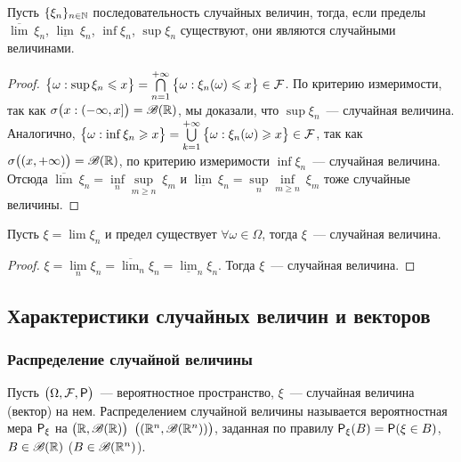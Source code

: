 \begin{lemma}
	Пусть $\{ \xi_n \}_{n \in \N}$ последовательность случайных величин, тогда, если пределы $\overline{\lim}~\xi_n$, $\underline{\lim}~\xi_n$, $\inf\xi_n$, $\sup\xi_n$ существуют, они являются случайными величинами.
	\begin{proof}
		$\big\{\omega : \sup \xi_n \leqslant x \big\} = \bigcap\limits_{n = 1}^{+\infty}\big\{\omega : \xi_n(\omega) \leqslant x \big\} \in \F$. По критерию измеримости, так как $\sigma\big(x : (-\infty, x]\big) = \B(\R)$, мы доказали, что $\sup\xi_n$~--- случайная величина. Аналогично, $\big\{\omega : \inf \xi_n \geqslant x \big\} = \bigcup\limits_{k = 1}^{+\infty}\big\{\omega : \xi_n(\omega) \geqslant x \big\} \in \F$, так как $\sigma\big((x, +\infty)\big) = \B(\R)$, по критерию измеримости $\inf\xi_n$~--- случайная величина. Отсюда $\overline{\lim}~\xi_n = \inf\limits_n\sup\limits_{m \geqslant n}~\xi_m$ и $\underline{\lim}~\xi_n = \sup\limits_n\inf\limits_{m \geqslant n}~\xi_m$ тоже случайные величины.
	\end{proof}
\end{lemma}

\begin{consequence}
	Пусть $\xi = \lim \xi_n$ и предел существует $\forall \omega \in \Omega$, тогда $\xi$~--- случайная величина.
	\begin{proof}
	$\xi = \lim\limits_n \xi_n = \overline{\lim}_n \xi_n = \underline{\lim}_n \xi_n$. Тогда $\xi$~--- случайная величина.
	\end{proof}
\end{consequence}

\subsection{Характеристики случайных величин и векторов}
\subsubsection*{ Распределение случайной величины}
\begin{definition}
	Пусть $\big(\Omega, \F, \P \big)$~--- вероятностное пространство, $\xi$~--- случайная величина (вектор) на нем. Распределением случайной величины называется вероятностная мера $\P_\xi$ на $\big(\R, \B(\R)\big)$ $\big((\R^n, \B(\R^n))\big)$, заданная по правилу $\P_\xi(B) = \P(\xi \in B)$, $B \in \B(\R)$ ($B \in \B(\R^n)$).
\end{definition}

